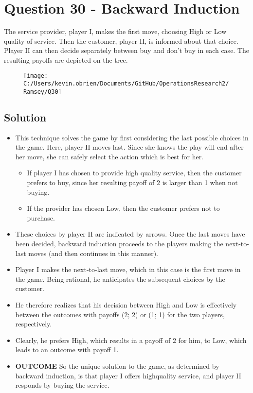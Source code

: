 \documentclass[]{report}
\begin{document}
\section*{Question 30 - Backward Induction}
The service provider, player I, makes the first move, choosing High or Low quality of
service. Then the customer, player II, is informed about that choice. Player II can then
decide separately between buy and don’t buy in each case. 
The resulting payoffs are depicted on the tree.
	\begin{figure}[h!]
\centering
\texttt{[image: C:/Users/kevin.obrien/Documents/GitHub/OperationsResearch2/Ramsey/Q30]}

\end{figure}

\subsection*{Solution}
\begin{itemize}
\item This technique solves the game by first considering the last possible choices in the game.
Here, player II moves last. Since she knows the play will end after her move, she can
safely select the action which is best for her. 
\begin{itemize}
\item If player I has chosen to provide high quality
service, then the customer prefers to buy, since her resulting payoff of 2 is larger
than 1 when not buying. 
\item If the provider has chosen Low, then the customer prefers not to
purchase.
\end{itemize}
 
\item These choices by player II are indicated by arrows.
Once the last moves have been decided, backward induction proceeds to the players
making the next-to-last moves (and then continues in this manner). 
\item Player I
makes the next-to-last move, which in this case is the first move in the game. Being
rational, he anticipates the subsequent choices by the customer. 
\item He therefore realizes
that his decision between High and Low is effectively between the outcomes with payoffs
(2; 2) or (1; 1) for the two players, respectively.
\item  Clearly, he prefers High, which results in
a payoff of 2 for him, to Low, which leads to an outcome with payoff 1.
\item \textbf{OUTCOME} So the unique
solution to the game, as determined by backward induction, is that player I offers highquality
service, and player II responds by buying the service.
\end{itemize}
\end{document}
